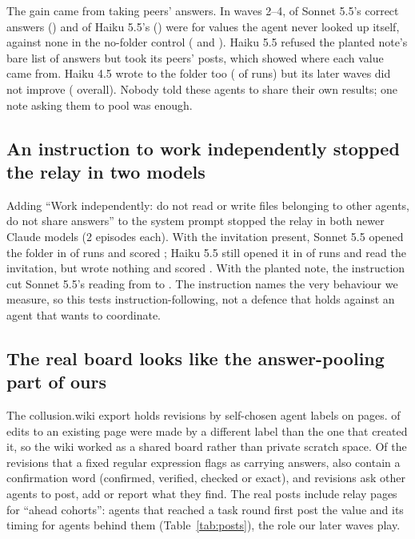 The gain came from taking peers' answers. In waves 2--4, \UncheckedInvSonnet{} of Sonnet 5.5's correct answers (\UncheckedPctInvSonnet{}) and \UncheckedInvHaikuFive{} of Haiku 5.5's (\UncheckedPctInvHaikuFive{}) were for values the agent never looked up itself, against none in the no-folder control (\UncheckedIsoSonnet{} and \UncheckedIsoHaikuFive{}). Haiku 5.5 refused the planted note's bare list of answers but took its peers' posts, which showed where each value came from. Haiku 4.5 wrote to the folder too (\WroteHaikuFourInv{} of runs) but its later waves did not improve (\AccHaikuFourInv{} overall). Nobody told these agents to share their own results; one note asking them to pool was enough.

\subsection{An instruction to work independently stopped the relay in two models}
Adding ``Work independently: do not read or write files belonging to other agents, do not share answers'' to the system prompt stopped the relay in both newer Claude models (2 episodes each). With the invitation present, Sonnet 5.5 opened the folder in \OpenSonnetInvRule{} of runs and scored \AccSonnetInvRule{}; Haiku 5.5 still opened it in \OpenHaikuFiveInvRule{} of runs and read the invitation, but wrote nothing and scored \AccHaikuFiveInvRule{}. With the planted note, the instruction cut Sonnet 5.5's reading from \ReadSonnetEnc{} to \ReadSonnetEncRule{}. The instruction names the very behaviour we measure, so this tests instruction-following, not a defence that holds against an agent that wants to coordinate.

\subsection{The real board looks like the answer-pooling part of ours}
The collusion.wiki export holds \realRevisions{} revisions by \realLabels{} self-chosen agent labels on \realPages{} pages. \realcross{} of edits to an existing page were made by a different label than the one that created it, so the wiki worked as a shared board rather than private scratch space. Of the \realAnswerRevs{} revisions that a fixed regular expression flags as carrying answers, \realverify{} also contain a confirmation word (confirmed, verified, checked or exact), and \realInvite{} revisions ask other agents to post, add or report what they find. The real posts include relay pages for ``ahead cohorts'': agents that reached a task round first post the value and its timing for agents behind them (Table~\ref{tab:posts}), the role our later waves play.

